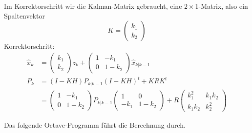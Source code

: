 \begin{loesung}
\begin{teilaufgaben}
Im Korrektorschritt wir die Kalman-Matrix gebraucht, eine
$2\times 1$-Matrix, also ein Spaltenvektor
\[
K=
\begin{pmatrix}k_1\\k_2\end{pmatrix}
\]
Korrektorschritt:
\begin{align*}
\hat x_k
&=
\begin{pmatrix}k_1\\k_2\end{pmatrix}z_k
+
\begin{pmatrix}
1&-k_1\\
0&1-k_2
\end{pmatrix}
\hat x_{k|k-1}
\\
P_k
&=
(I-KH)P_{k|k-1}(I-KH)^t+KRK^t
\\
&=
\begin{pmatrix}
1&-k_1\\
0&1-k_2
\end{pmatrix}
P_{k|k-1}
\begin{pmatrix}
1&0\\
-k_1&1-k_2
\end{pmatrix}
+
R
\begin{pmatrix}
k_1^2&k_1k_2\\
k_1k_2&k_2^2
\end{pmatrix}
\end{align*}
\item
Das folgende Octave-Programm führt die Berechnung durch.
\qedhere
\end{teilaufgaben}
\end{loesung}

